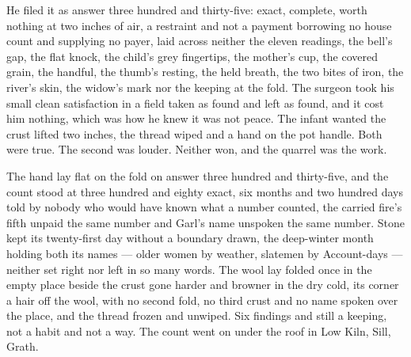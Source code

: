 He filed it as answer three hundred and thirty-five: exact, complete, worth nothing at two inches of air, a restraint and not a payment borrowing no house count and supplying no payer, laid across neither the eleven readings, the bell's gap, the flat knock, the child's grey fingertips, the mother's cup, the covered grain, the handful, the thumb's resting, the held breath, the two bites of iron, the river's skin, the widow's mark nor the keeping at the fold. The surgeon took his small clean satisfaction in a field taken as found and left as found, and it cost him nothing, which was how he knew it was not peace. The infant wanted the crust lifted two inches, the thread wiped and a hand on the pot handle. Both were true. The second was louder. Neither won, and the quarrel was the work.

The hand lay flat on the fold on answer three hundred and thirty-five, and the count stood at three hundred and eighty exact, six months and two hundred days told by nobody who would have known what a number counted, the carried fire's fifth unpaid the same number and Garl's name unspoken the same number. Stone kept its twenty-first day without a boundary drawn, the deep-winter month holding both its names --- older women by weather, slatemen by Account-days --- neither set right nor left in so many words. The wool lay folded once in the empty place beside the crust gone harder and browner in the dry cold, its corner a hair off the wool, with no second fold, no third crust and no name spoken over the place, and the thread frozen and unwiped. Six findings and still a keeping, not a habit and not a way. The count went on under the roof in Low Kiln, Sill, Grath.
